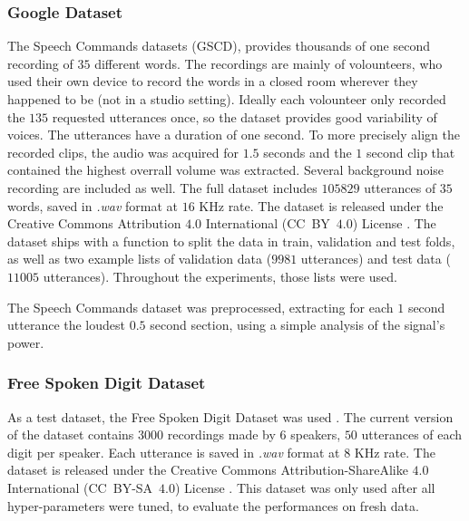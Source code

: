 \subsubsection{Google Dataset}


The Speech Commands datasets \cite{warden2018speech} (GSCD), provides thousands
of one second recording of $35$ different words. The recordings are mainly of
volounteers, who used their own device to record the words in a closed room
wherever they happened to be (not in a studio setting). Ideally each volounteer
only recorded the $135$ requested utterances once, so the dataset provides good
variability of voices.
The utterances have a duration of one second.
To more precisely align the recorded clips, the audio was acquired for $1.5$
seconds and the $1$ second clip that contained the highest overrall volume was
extracted.
Several background noise recording are included as well.
The full dataset includes $105829$ utterances of $35$ words, saved in
\textit{.wav} format at $16$ KHz rate.
The dataset is released under the Creative Commons Attribution $4.0$
International (CC~BY~$4.0$) License \cite{ccby4}.
The dataset ships with a function to split the data in train, validation and
test folds, as well as two example lists of validation data ($9981$ utterances)
and test data ($11005$ utterances).
Throughout the experiments, those lists were used.

The Speech Commands dataset was preprocessed, extracting for each $1$ second
utterance the loudest $0.5$ second section, using a simple analysis of the
signal's power.


\subsubsection{Free Spoken Digit Dataset}

As a test dataset, the Free Spoken Digit Dataset was used
\cite{zohar_jackson_2018_1342401}.
The current version of the dataset contains $3000$ recordings made by $6$
speakers, $50$ utterances of each digit per speaker.
Each utterance is saved in \textit{.wav} format at $8$ KHz rate.
The dataset is released under the Creative Commons 
Attribution-ShareAlike $4.0$ International (CC~BY-SA~$4.0$)
License \cite{ccbysa4}.
This dataset was only used after all hyper-parameters were tuned, to evaluate
the performances on fresh data.

